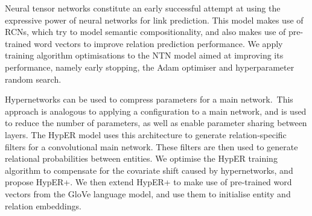 Neural tensor networks constitute an early successful attempt at using the expressive power of neural networks for link prediction. This model makes use of RCNs, which try to model semantic compositionality, and also makes use of pre-trained word vectors to improve relation prediction performance. We apply training algorithm optimisations to the NTN model aimed at improving its performance, namely early stopping, the Adam optimiser and hyperparameter random search. \par

\noindent Hypernetworks can be used to compress parameters for a main network.\ This approach is analogous to applying a configuration to a main network, and is used to reduce the number of parameters, as well as enable parameter sharing between layers. The HypER model uses this architecture to generate relation-specific filters for a convolutional main network. These filters are then used to generate relational probabilities between entities. We optimise the HypER training algorithm to compensate for the covariate shift caused by hypernetworks, and propose HypER+. We then extend HypER+ to make use of pre-trained word vectors from the GloVe language model, and use them to initialise entity and relation embeddings. 
